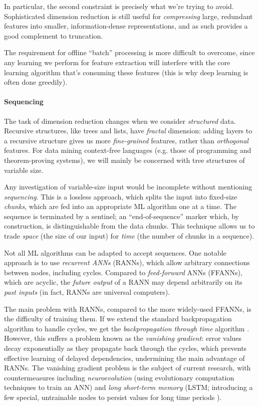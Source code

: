 In particular, the second constraint is precisely what we're trying to avoid. Sophisticated dimension reduction is still useful for \emph{compressing} large, redundant features into smaller, information-dense representations, and as such provides a good complement to truncation.

The requirement for offline ``batch'' processing is more difficult to overcome, since any learning we perform for feature extraction will interfere with the core learning algorithm that's consuming these features (this is why deep learning is often done greedily).

\paragraph{Sequencing}

The task of dimension reduction changes when we consider \emph{structured} data. Recursive structures, like trees and lists, have \emph{fractal} dimension: adding layers to a recursive structure gives us more \emph{fine-grained} features, rather than \emph{orthogonal} features. For data mining context-free languages (e.g. those of programming and theorem-proving systems), we will mainly be concerned with tree structures of variable size.

Any investigation of variable-size input would be incomplete without mentioning \emph{sequencing}. This is a lossless approach, which splits the input into fixed-size \emph{chunks}, which are fed into an appropriate ML algorithm one at a time. The sequence is terminated by a sentinel; an ``end-of-sequence'' marker which, by construction, is distinguishable from the data chunks. This technique allows us to trade \emph{space} (the size of our input) for \emph{time} (the number of chunks in a sequence).

Not all ML algorithms can be adapted to accept sequences. One notable approach is to use \emph{recurrent ANNs} (RANNs), which allow arbitrary connections between nodes, including cycles. Compared to \emph{feed-forward} ANNs (FFANNs), which are acyclic, the \emph{future output} of a RANN may depend arbitrarily on its \emph{past inputs} (in fact, RANNs are universal computers).

The main problem with RANNs, compared to the more widely-used FFANNs, is the difficulty of training them. If we extend the standard backpropagation algorithm to handle cycles, we get the \emph{backpropagation through time} algorithm \citep{werbos1990backpropagation}. However, this suffers a problem known as the \emph{vanishing gradient}: error values decay exponentially as they propagate back through the cycles, which prevents effective learning of delayed dependencies, undermining the main advantage of RANNs. The vanishing gradient problem is the subject of current research, with countermeasures including \emph{neuroevolution} (using evolutionary computation techniques to train an ANN) and \emph{long short-term memory} (LSTM; introducing a few special, untrainable nodes to persist values for long time periods \citep{hochreiter1997long}).


